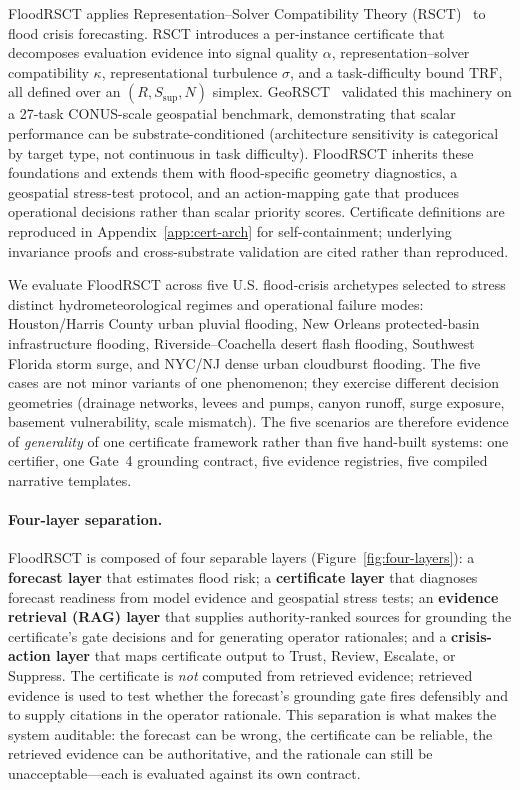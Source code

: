 \documentclass[sigconf,nonacm=true,review,authoryear]{acmart}
\begin{document}
FloodRSCT applies Representation--Solver Compatibility Theory (RSCT)~\citep{martin2026rsct} to flood crisis forecasting. RSCT introduces a per-instance certificate that decomposes evaluation evidence into signal quality $\alpha$, representation--solver compatibility $\kappa$, representational turbulence $\sigma$, and a task-difficulty bound $\mathrm{TRF}$, all defined over an $(R, S_{\text{sup}}, N)$ simplex. GeoRSCT~\citep{martin2026georsct} validated this machinery on a 27-task CONUS-scale geospatial benchmark, demonstrating that scalar performance can be substrate-conditioned (architecture sensitivity is categorical by target type, not continuous in task difficulty). FloodRSCT inherits these foundations and extends them with flood-specific geometry diagnostics, a geospatial stress-test protocol, and an action-mapping gate that produces operational decisions rather than scalar priority scores. Certificate definitions are reproduced in Appendix~\ref{app:cert-arch} for self-containment; underlying invariance proofs and cross-substrate validation are cited rather than reproduced.

We evaluate FloodRSCT across five U.S. flood-crisis archetypes selected to stress distinct hydrometeorological regimes and operational failure modes: Houston/Harris County urban pluvial flooding, New Orleans protected-basin infrastructure flooding, Riverside--Coachella desert flash flooding, Southwest Florida storm surge, and NYC/NJ dense urban cloudburst flooding. The five cases are not minor variants of one phenomenon; they exercise different decision geometries (drainage networks, levees and pumps, canyon runoff, surge exposure, basement vulnerability, scale mismatch). The five scenarios are therefore evidence of \emph{generality} of one certificate framework rather than five hand-built systems: one certifier, one Gate~4 grounding contract, five evidence registries, five compiled narrative templates.

\paragraph{Four-layer separation.}
FloodRSCT is composed of four separable layers (Figure~\ref{fig:four-layers}): a \textbf{forecast layer} that estimates flood risk; a \textbf{certificate layer} that diagnoses forecast readiness from model evidence and geospatial stress tests; an \textbf{evidence retrieval (RAG) layer} that supplies authority-ranked sources for grounding the certificate's gate decisions and for generating operator rationales; and a \textbf{crisis-action layer} that maps certificate output to Trust, Review, Escalate, or Suppress. The certificate is \emph{not} computed from retrieved evidence; retrieved evidence is used to test whether the forecast's grounding gate fires defensibly and to supply citations in the operator rationale. This separation is what makes the system auditable: the forecast can be wrong, the certificate can be reliable, the retrieved evidence can be authoritative, and the rationale can still be unacceptable---each is evaluated against its own contract.
\end{document}
